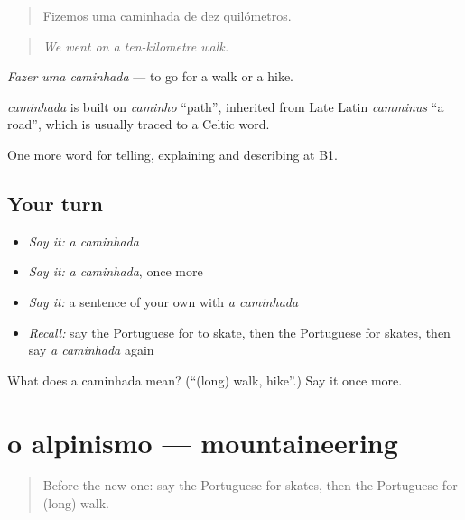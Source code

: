 \begin{quote}
Fizemos uma caminhada de dez quilómetros.
\end{quote}

\begin{quote}
\emph{We went on a ten-kilometre walk.}
\end{quote}

\emph{Fazer uma caminhada} — to go for a walk or a hike.

\begin{cousinweb}
\emph{caminhada} is built on \emph{caminho} \textquotedblleft{}path\textquotedblright{}, inherited from Late Latin \emph{camminus} \textquotedblleft{}a road\textquotedblright{}, which is usually traced to a Celtic word.
\end{cousinweb}

\begin{grammarlens}[title={What you've built}]
One more word for telling, explaining and describing at B1.
\end{grammarlens}

\subsection*{Your turn}
\begin{itemize}
\raggedright
  \item \emph{Say it:} \emph{a caminhada}
  \item \emph{Say it:} \emph{a caminhada}, once more
  \item \emph{Say it:} a sentence of your own with \emph{a caminhada}
  \item \emph{Recall:} say the Portuguese for to skate, then the Portuguese for skates, then say \emph{a caminhada} again
\end{itemize}

\begin{tcolorbox}[breakable,colback=teal!4,colframe=teal!35!black,title={Before you move on}]
What does a caminhada mean? (\textquotedblleft{}(long) walk, hike\textquotedblright{}.) Say it once more.
\end{tcolorbox}
\section[o alpinismo]{o alpinismo — mountaineering}

\label{lesson:PT-C507-alpinismo}



\begin{quote}
Before the new one: say the Portuguese for skates, then the Portuguese for (long) walk.
\end{quote}

